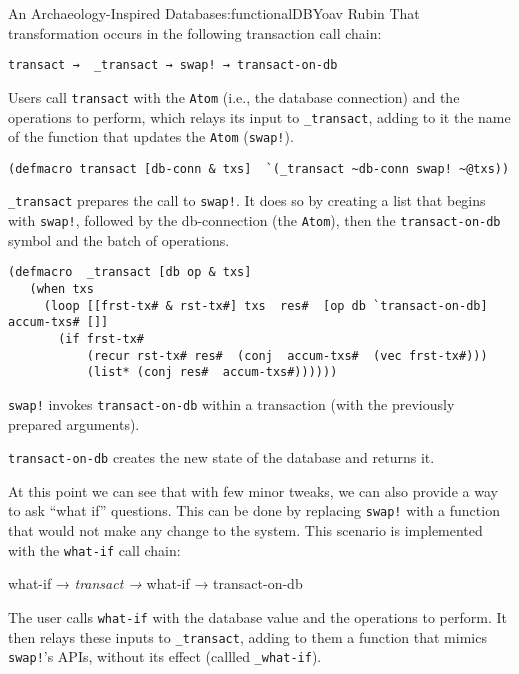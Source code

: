 \begin{aosachapter}{An Archaeology-Inspired Database}{s:functionalDB}{Yoav Rubin}
That transformation occurs in the following transaction call chain:

\begin{verbatim}
transact →  _transact → swap! → transact-on-db
\end{verbatim}

\begin{aosaitemize}
\item
  Users call \texttt{transact} with the \texttt{Atom} (i.e., the
  database connection) and the operations to perform, which relays its
  input to \texttt{\_transact}, adding to it the name of the function
  that updates the \texttt{Atom} (\texttt{swap!}).

\begin{verbatim}
(defmacro transact [db-conn & txs]  `(_transact ~db-conn swap! ~@txs))
\end{verbatim}
\item
  \texttt{\_transact} prepares the call to \texttt{swap!}. It does so by
  creating a list that begins with \texttt{swap!}, followed by the
  db-connection (the \texttt{Atom}), then the \texttt{transact-on-db}
  symbol and the batch of operations.

\begin{verbatim}
(defmacro  _transact [db op & txs]
   (when txs
     (loop [[frst-tx# & rst-tx#] txs  res#  [op db `transact-on-db]  accum-txs# []]
       (if frst-tx#
           (recur rst-tx# res#  (conj  accum-txs#  (vec frst-tx#)))
           (list* (conj res#  accum-txs#))))))
\end{verbatim}
\item
  \texttt{swap!} invokes \texttt{transact-on-db} within a transaction
  (with the previously prepared arguments).
\item
  \texttt{transact-on-db} creates the new state of the database and
  returns it.
\end{aosaitemize}

At this point we can see that with few minor tweaks, we can also provide
a way to ask ``what if'' questions. This can be done by replacing
\texttt{swap!} with a function that would not make any change to the
system. This scenario is implemented with the \texttt{what-if} call
chain:

what-if → \emph{transact → }what-if → transact-on-db

\begin{aosaitemize}
\item
  The user calls \texttt{what-if} with the database value and the
  operations to perform. It then relays these inputs to
  \texttt{\_transact}, adding to them a function that mimics
  \texttt{swap!}'s APIs, without its effect (callled
  \texttt{\_what-if}).


\end{aosaitemize}
\end{aosachapter}
